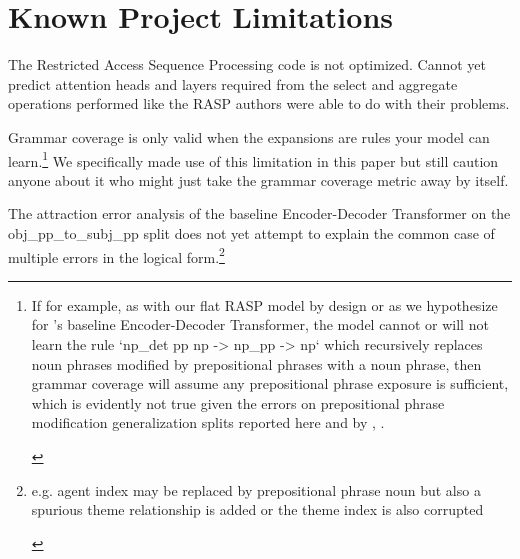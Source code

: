 \documentclass[11pt]{article}
\begin{document}
\clearpage
\section*{Known Project Limitations}

The Restricted Access Sequence Processing code is not optimized. Cannot yet predict attention heads and layers required from the select and aggregate operations performed like the RASP authors \cite{Weiss2021} were able to do with their problems.

Grammar coverage \cite{fuzzingbook2023:GrammarCoverageFuzzer} is only valid when the expansions are rules your model can learn.\footnote{\begin{footnotesize}If for example, as with our flat RASP model by design or as we hypothesize for \cite{Wu2023}'s baseline Encoder-Decoder Transformer, the model cannot or will not learn the rule `np\_det pp np -> np\_pp -> np` which recursively replaces noun phrases modified by prepositional phrases with a noun phrase, then grammar coverage will assume any prepositional phrase exposure is sufficient, which is evidently not true given the errors on prepositional phrase modification generalization splits reported here and by \cite{Wu2023}, \cite{KimLinzen2020}.
\end{footnotesize}
} We specifically made use of this limitation in this paper but still caution anyone about it who might just take the grammar coverage metric away by itself.

The attraction error analysis of the \cite{Wu2023} baseline Encoder-Decoder Transformer on the obj\_pp\_to\_subj\_pp split does not yet attempt to explain the common case of multiple errors in the logical form.\footnote{\begin{footnotesize}e.g. agent index may be replaced by prepositional phrase noun but also a spurious theme relationship is added or the theme index is also corrupted\end{footnotesize}}
\end{document}
